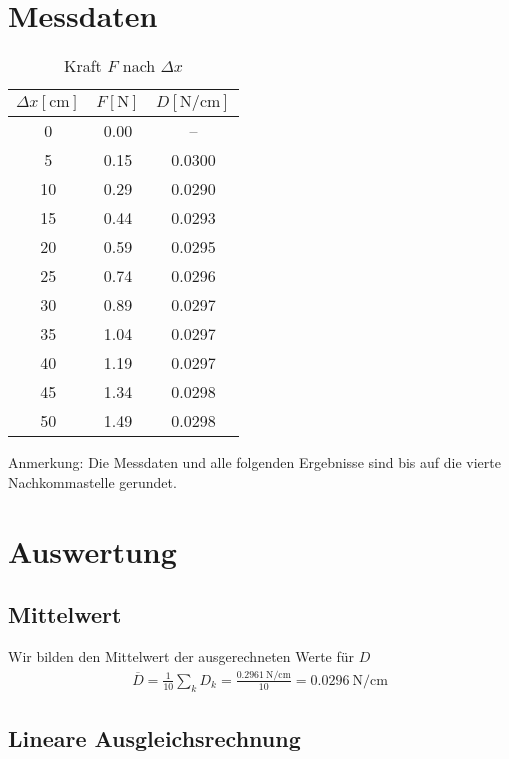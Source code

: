 \section{Messdaten}
\begin{table}
    \centering
    \caption{Kraft $ F $ nach $ \Delta x $ }
    \begin{tabular}{S S S}
        \toprule
        {$ \Delta x  [\unit{\cm}]$}  & {$ F [\unit{\newton}]  $}   & {$ D  [\unit{\newton\per\cm}] $} \\
                     &  0.00      & {--}   \\
        5             &  0.15      & 0.0300 \\
        10            &  0.29      & 0.0290 \\
        15            &  0.44      & 0.0293 \\
        20            &  0.59      & 0.0295 \\
        25            &  0.74      & 0.0296 \\
        30            &  0.89      & 0.0297 \\
        35            &  1.04      & 0.0297 \\
        40            &  1.19      & 0.0297 \\
        45            &  1.34      & 0.0298 \\
        50            &  1.49      & 0.0298 \\
        

    \end{tabular}
\end{table}

Anmerkung: Die Messdaten und alle folgenden Ergebnisse sind bis auf die vierte Nachkommastelle gerundet.

\section{Auswertung}
\subsection{Mittelwert}
Wir bilden den Mittelwert der ausgerechneten Werte für $D$
\begin{align}
    \overline{D} =\frac{1}{10} \sum_{k} D_k = \frac{\qty{0.2961}{\newton\per\cm}}{10} = \qty{0.0296}{\newton\per\cm}
\end{align}

\subsection{Lineare Ausgleichsrechnung}


